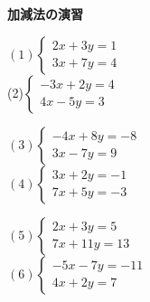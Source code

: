 \documentclass[b4paper,16.5pt,paparesize, landscape]{ltjsarticle}%
\begin{document}
{\textbf{\Large{加減法の演習}}}\hspace{\fill}{\scalebox{1.5}{（　）組（　　　　　　　　）}}\\
\begin{multicols*}{3}
$(1)\begin{cases}
	2x + 3y = 1 \\
	3 x + 7y = 4
\end{cases}$ 	\\[82mm]
(2)$\begin{cases}
	-3x + 2y = 4\\
	4x - 5y = 3
\end{cases}$\vfill\null\columnbreak

$(3)\begin{cases}
	-4x + 8y = -8\\
	3x - 7y = 9
\end{cases}$ 	\\[82mm]

$(4)\begin{cases}
	3x + 2y = -1\\
	7x + 5y = -3
\end{cases}$
 \vfill\null\columnbreak

$(5)\begin{cases}
	2x + 3y = 5\\
	7x + 11y = 13
\end{cases}$ 	\\[82mm]

$(6)\begin{cases}
	-5x - 7y = -11\\
	4x + 2y = 7
\end{cases}$



\end{multicols*}
\end{document}
